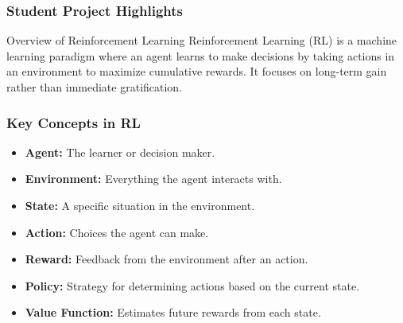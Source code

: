 \documentclass{beamer}
\begin{document}
\begin{frame}[fragile]
    \frametitle{Student Project Highlights}
    \begin{block}{Overview of Reinforcement Learning}
        Reinforcement Learning (RL) is a machine learning paradigm where an agent learns to make decisions by taking actions in an environment to maximize cumulative rewards. It focuses on long-term gain rather than immediate gratification.
    \end{block}
\end{frame}

\begin{frame}[fragile]
    \frametitle{Key Concepts in RL}
    \begin{itemize}
        \item \textbf{Agent:} The learner or decision maker.
        \item \textbf{Environment:} Everything the agent interacts with.
        \item \textbf{State:} A specific situation in the environment.
        \item \textbf{Action:} Choices the agent can make.
        \item \textbf{Reward:} Feedback from the environment after an action.
        \item \textbf{Policy:} Strategy for determining actions based on the current state.
        \item \textbf{Value Function:} Estimates future rewards from each state.
    \end{itemize}
\end{frame}
\end{document}
